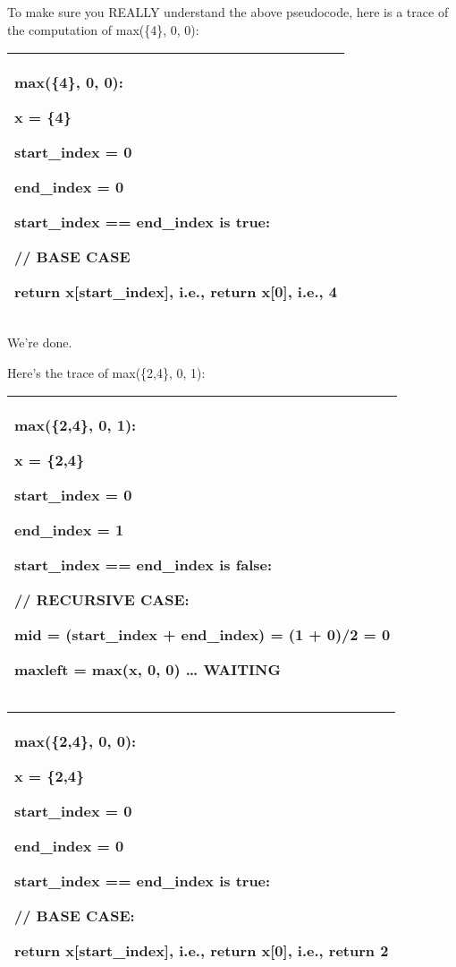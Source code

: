 \documentclass[
]{article}
\begin{document}
To make sure you REALLY understand the above pseudocode, here is a trace
of the computation of max(\{4\}, 0, 0):

\begin{longtable}[]{@{}l@{}}
\toprule
\endhead
\begin{minipage}[t]{0.97\columnwidth}\raggedright
max(\{4\}, 0, 0):

x = \{4\}

start\_index = 0

end\_index = 0

start\_index == end\_index is true:

// BASE CASE

return x{[}start\_index{]}, i.e., return x{[}0{]}, i.e., 4\strut
\end{minipage}\tabularnewline
\bottomrule
\end{longtable}

We're done.

Here's the trace of max(\{2,4\}, 0, 1):

\begin{longtable}[]{@{}l@{}}
\toprule
\endhead
\begin{minipage}[t]{0.97\columnwidth}\raggedright
max(\{2,4\}, 0, 1):

x = \{2,4\}

start\_index = 0

end\_index = 1

start\_index == end\_index is false:

// RECURSIVE CASE:

mid = (start\_index + end\_index) = (1 + 0)/2 = 0

maxleft = max(x, 0, 0) \ldots{} WAITING\strut
\end{minipage}\tabularnewline
\bottomrule
\end{longtable}

\begin{longtable}[]{@{}l@{}}
\toprule
\endhead
\begin{minipage}[t]{0.97\columnwidth}\raggedright
max(\{2,4\}, 0, 0):

x = \{2,4\}

start\_index = 0

end\_index = 0

start\_index == end\_index is true:

// BASE CASE:

return x{[}start\_index{]}, i.e., return x{[}0{]}, i.e., return 2\strut
\end{minipage}\tabularnewline
\bottomrule
\end{longtable}
\end{document}
